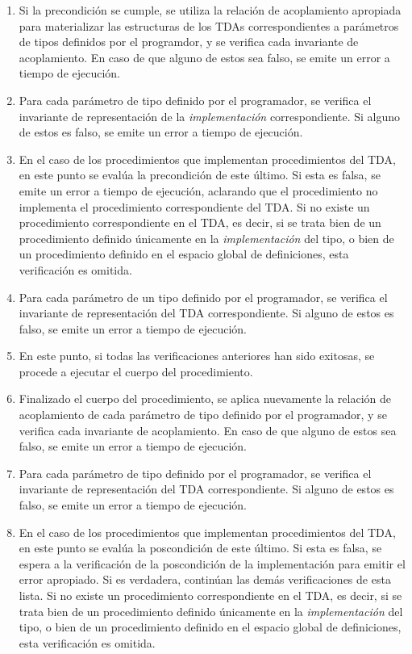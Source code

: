 {{\begin{enumerate}
  \item Si la precondición se cumple, se utiliza la relación de acoplamiento
  apropiada para materializar las estructuras de los TDAs correspondientes a
  parámetros de tipos definidos por el programdor, y se verifica cada invariante
  de acoplamiento. En caso de que alguno de estos sea falso, se emite un error a
  tiempo de ejecución.

  \item Para cada parámetro de tipo definido por el programador, se verifica
  el invariante de representación de la \textit{implementación} correspondiente.
  Si alguno de estos es falso, se emite un error a tiempo de ejecución.

  \item En el caso de los procedimientos que implementan procedimientos del TDA,
  en este punto se evalúa la precondición de este último. Si esta es falsa, se
  emite un error a tiempo de ejecución, aclarando que el procedimiento no
  implementa el procedimiento correspondiente del TDA. Si no existe un procedimiento
  correspondiente en el TDA, es decir, si se trata bien de un procedimiento
  definido únicamente en la \textit{implementación} del tipo, o bien de un
  procedimiento definido en el espacio global de definiciones, esta verificación
  es omitida.

  \item Para cada parámetro de un tipo definido por el programador, se verifica
  el invariante de representación del TDA correspondiente. Si alguno de estos es
  falso, se emite un error a tiempo de ejecución.

  \item En este punto, si todas las verificaciones anteriores han sido exitosas,
  se procede a ejecutar el cuerpo del procedimiento.

  \item Finalizado el cuerpo del procedimiento, se aplica nuevamente la relación
  de acoplamiento de cada parámetro de tipo definido por el programador, y se
  verifica cada invariante de acoplamiento. En caso de que alguno de estos sea
  falso, se emite un error a tiempo de ejecución.

  \item Para cada parámetro de tipo definido por el programador, se verifica el
  invariante de representación del TDA correspondiente. Si alguno de estos es
  falso, se emite un error a tiempo de ejecución.

  \item \label{posttda} En el caso de los procedimientos que implementan procedimientos del TDA,
  en este punto se evalúa la poscondición de este último. Si esta es falsa, se
  espera a la verificación de la poscondición de la implementación para emitir
  el error apropiado. Si es verdadera, continúan las demás verificaciones de
  esta lista. Si no existe un procedimiento correspondiente en el TDA, es decir,
  si se trata bien de un procedimiento definido únicamente en la
  \textit{implementación} del tipo, o bien de un procedimiento definido en el
  espacio global de definiciones, esta verificación es omitida.


\end{enumerate}}}
